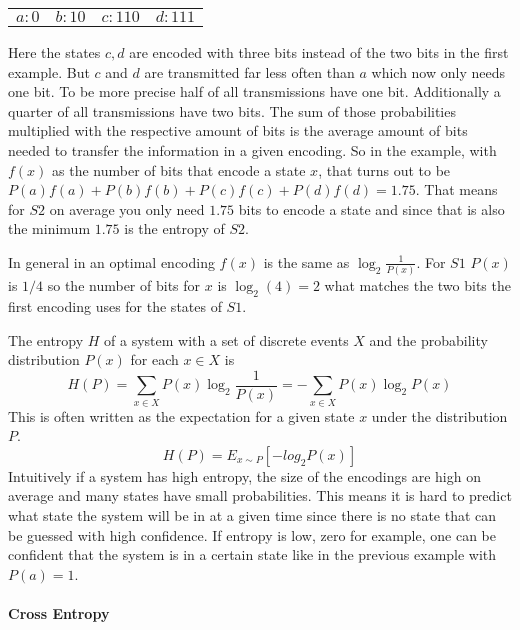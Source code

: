 \begin{center}
    \begin{tabular} {c c c c}
        $a: 0$ & $b: 10$ & $c: 110$ & $d: 111$
    \end{tabular}
\end{center}

Here the states $c, d$ are encoded with three bits instead of the two bits in the first example.
But $c$ and $d$ are transmitted far less often than $a$ which now only needs one bit. To be more precise
half of all transmissions have one bit. Additionally a quarter of all transmissions have two bits. 
The sum of those probabilities multiplied with the respective amount of bits is the average amount of bits
needed to transfer the information in a given encoding. So in the example, with $f(x)$ as the number of
bits that encode a state $x$, that turns out to be $P(a)f(a)+P(b)f(b)+P(c)f(c)+P(d)f(d)=1.75$.
That means for $S2$ on average you only need $1.75$ bits to encode a state and since that is also the
minimum $1.75$ is the entropy of $S2$.

In general in an optimal encoding $f(x)$ is the same as $\log_{2} \frac{1}{P(x)}$. For $S1$ $P(x)$ is $1/4$
so the number of bits for $x$ is $\log_{2} (4)=2$ what matches the two bits the first encoding uses 
for the states of $S1$.

The entropy $H$ of a system with a set of discrete events $X$ and the probability distribution $P(x)$
for each $x\in X$ is
\begin{equation}
    H(P)=\sum_{x\in X} P(x)\log_{2} \frac{1}{P(x)} = -\sum_{x\in X} P(x)\log_{2} P(x)
\end{equation}
This is often written as the expectation for a  given state $x$ under the distribution $P$.
\[ H(P)=E_{x\sim P}[-log_{2}P(x)]\]
Intuitively if a system has high entropy, the size of the encodings are high on average and many states
have small probabilities. This means it is hard to predict what state the system will be in at a given time
since there is no state that can be guessed with high confidence. If entropy is low, zero for example,
one can be confident that the system is in a certain state like in the previous example with $P(a)=1$.


\paragraph{Cross Entropy} \mbox{}\\

